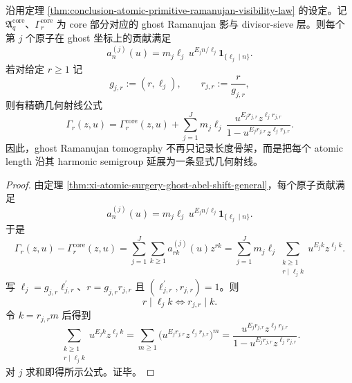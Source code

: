 \begin{theorem}\label{thm:conclusion-atomic-ghost-ramanujan-ray-law}
沿用定理 \ref{thm:conclusion-atomic-primitive-ramanujan-visibility-law} 的设定。记 \(\mathfrak A_q^{\mathrm{core}}\)、\(\Gamma_r^{\mathrm{core}}\) 为 core 部分对应的 ghost Ramanujan 影与 divisor-sieve 层。则每个第 \(j\) 个原子在 ghost 坐标上的贡献满足
\[
a_n^{(j)}(u)=m_j\ell_j\,u^{E_j n/\ell_j}\mathbf 1_{\{\ell_j\mid n\}}.
\]
若对给定 \(r\ge 1\) 记
\[
g_{j,r}:=(r,\ell_j),
\qquad
r_{j,r}:=\frac{r}{g_{j,r}},
\]
则有精确几何射线公式
\[
\Gamma_r(z,u)
=
\Gamma_r^{\mathrm{core}}(z,u)
+
\sum_{j=1}^{J}
m_j\ell_j\,
\frac{u^{E_j r_{j,r}}z^{\ell_j r_{j,r}}}{1-u^{E_j r_{j,r}}z^{\ell_j r_{j,r}}}.
\]
因此，ghost Ramanujan tomography 不再只记录长度骨架，而是把每个 atomic length 沿其 harmonic semigroup 延展为一条显式几何射线。
\end{theorem}
\begin{proof}
由定理 \ref{thm:xi-atomic-surgery-ghost-abel-shift-general}，每个原子贡献满足
\[
a_n^{(j)}(u)=m_j\ell_j\,u^{E_j n/\ell_j}\mathbf 1_{\{\ell_j\mid n\}}.
\]
于是
\[
\Gamma_r(z,u)-\Gamma_r^{\mathrm{core}}(z,u)
=
\sum_{j=1}^{J}\sum_{k\ge 1}a_{rk}^{(j)}(u)z^{rk}
=
\sum_{j=1}^{J}m_j\ell_j
\sum_{\substack{k\ge 1\\ r\mid \ell_j k}}
u^{E_j k}z^{\ell_j k}.
\]
写 \(\ell_j=g_{j,r}\ell_{j,r}^{\prime}\)、\(r=g_{j,r}r_{j,r}\) 且 \((\ell_{j,r}^{\prime},r_{j,r})=1\)。则
\[
r\mid \ell_j k
\iff
r_{j,r}\mid k.
\]
令 \(k=r_{j,r}m\) 后得到
\[
\sum_{\substack{k\ge 1\\ r\mid \ell_j k}}
u^{E_j k}z^{\ell_j k}
=
\sum_{m\ge 1}
\bigl(u^{E_j r_{j,r}}z^{\ell_j r_{j,r}}\bigr)^m
=
\frac{u^{E_j r_{j,r}}z^{\ell_j r_{j,r}}}{1-u^{E_j r_{j,r}}z^{\ell_j r_{j,r}}}.
\]
对 \(j\) 求和即得所示公式。证毕。
\end{proof}

